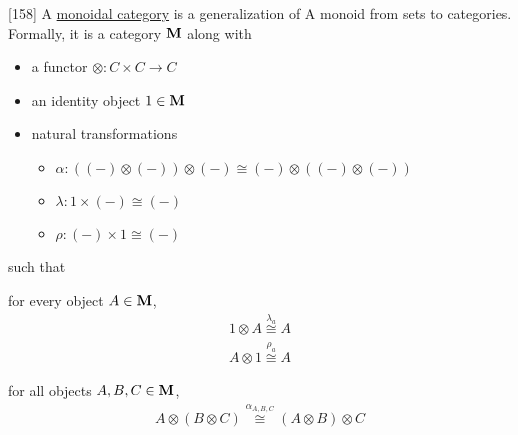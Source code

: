 \begin{definition}\label{def:monoidal_category}\cite{MacLane1994}[158]
  A \uline{monoidal category} is a generalization of A monoid from sets to categories. Formally, it is a category $\operatorname{\mathbf{M}}$ along with
  \begin{itemize}
    \item a functor $\otimes: C \times C \to C$
    \item an identity object $1 \in \operatorname{\mathbf{M}}$
    \item natural transformations
    \begin{itemize}
      \item[] $\alpha: ((-) \otimes (-)) \otimes (-) \cong (-) \otimes ((-) \otimes (-))$
      \item[] $\lambda: 1 \times (-) \cong (-)$
      \item[] $\rho: (-) \times 1 \cong (-)$
    \end{itemize}
  \end{itemize}
  such that
  \begin{defenum}
    \item for every object $A \in \operatorname{\mathbf{M}}$,
    \begin{align*}
      1 \otimes A \overset {\lambda_a} \cong A
      \\
      A \otimes 1 \overset {\rho_a} \cong A
    \end{align*}

    \item for all objects $A, B, C \in \operatorname{\mathbf{M}}$,
    \begin{align*}
      A \otimes (B \otimes C) \overset {\alpha_{A,B,C}} \cong (A \otimes B) \otimes C
    \end{align*}


\end{defenum}
\end{definition}
